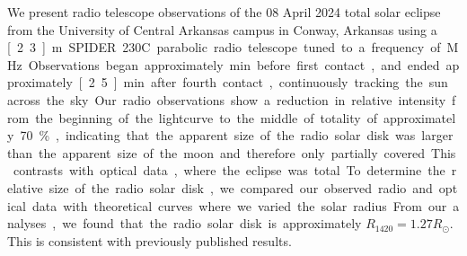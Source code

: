 We present radio telescope observations of the 08 April 2024 total solar eclipse from the University of Central Arkansas campus in Conway, Arkansas using a \unit[2.3]{m} SPIDER 230C parabolic radio telescope tuned to a frequency of \unit[1420]{MHz}.
Observations began approximately \unit[19]{min} before first contact, and ended approximately \unit[2.5]{min} after fourth contact, continuously tracking the sun across the sky.
Our radio observations show a reduction in relative intensity from the beginning of the lightcurve to the middle of totality of approximately 70\%, indicating that the apparent size of the radio solar disk was larger than the apparent size of the moon and therefore only partially covered.
This contrasts with optical data, where the eclipse was total.
To determine the relative size of the radio solar disk, we compared our observed radio and optical data with theoretical curves where we varied the solar radius.
From our analyses, we found that the radio solar disk is approximately $R_{\mathrm{1420}} = 1.27 R_{\odot}$.
This is consistent with previously published results.